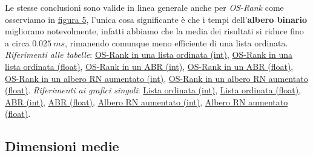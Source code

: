\documentclass[onecolumn]{article}
\begin{document}
Le stesse conclusioni sono valide in linea generale anche per \textit{OS-Rank} come osserviamo in \hyperref[fig:os-rank-s]{figura 5}, l'unica cosa significante è che i tempi dell'\textbf{albero binario} migliorano notevolmente, infatti abbiamo che la media dei risultati si riduce fino a circa \(0.025\:ms\), rimanendo comunque meno efficiente di una lista ordinata.
\newline
\newline
\textit{Riferimenti alle tabelle}: \hyperref[label:lista-ordinata-s-os-rank]{OS-Rank in una lista ordinata (int)}, \hyperref[label:lista-ordinata-s-float-os-rank]{OS-Rank in una lista ordinata (float)}, \hyperref[label:abr-s-os-rank]{OS-Rank in un ABR (int)}, \hyperref[label:abr-s-float-os-rank]{OS-Rank in un ABR (float)}, \hyperref[label:rn-aumentato-s-os-rank]{OS-Rank in un albero RN aumentato (int)}, \hyperref[label:rn-aumentato-s-float-os-rank]{OS-Rank in un albero RN aumentato (float)}.
\newline
\newline
\textit{Riferimenti ai grafici singoli}: \hyperref[label:lista-ordinata-s]{Lista ordinata (int)}, \hyperref[label:lista-ordinata-s-float]{Lista ordinata (float)}, \hyperref[label:abr-s]{ABR (int)}, \hyperref[label:abr-s-float]{ABR (float)}, \hyperref[label:rn-aumentato-s]{Albero RN aumentato (int)}, \hyperref[label:rn-aumentato-s-float]{Albero RN aumentato (float)}.

\newpage
\subsection{Dimensioni medie}
\end{document}

